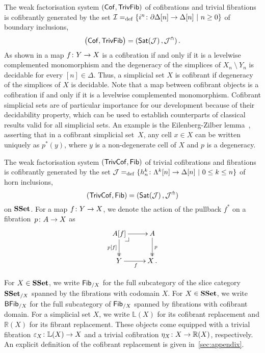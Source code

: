 \documentclass[reqno,10pt,a4paper,oneside,draft]{amsart}
\begin{document}
The weak factorisation system $(\mathsf{Cof}, \mathsf{TrivFib})$ of cofibrations and trivial fibrations  is cofibrantly generated by the set $\mathcal{I} =_{\operatorname{def}} \{ i^n \colon  \partial \Delta[n] \to \Delta[n] \ | \ n \geq 0 \}$  of boundary 
inclusions, \ie 
\[
\big( \mathsf{Cof}, \mathsf{TrivFib} \big) = ( \mathsf{Sat}(\mathcal{J}) \, , \mathcal{J}^\pitchfork) \, .
\]
As shown in \cite[Proposition~5.1.4]{henry2018wms} a map $f \colon Y \to X$ is a cofibration if  and only if 
it is a levelwise complemented monomorphism and the degeneracy of the simplices of $X_n ~\setminus~Y_n$ is decidable for every $[n] \in \Delta$. Thus, a simplicial set $X$ is
cofibrant if  degeneracy of the simplices of $X$ is decidable.
Note that a map between cofibrant objects is a cofibration
if and only if it is a levelwise complemented monomorphism. 
Cofibrant simplicial sets are of particular importance for our development because of their decidability property, which can be used to establish counterparts of classical results valid for all simplicial sets. An example is the Eilenberg-Zilber lemma~\cite[Lemma~5.1.2]{henry2018wms}, asserting that in a cofibrant simplicial set~$X$, any cell $x \in X$ can be written uniquely as $p^*(y)$, where $y$ is a non-degenerate cell of $X$ and $p$ is a degeneracy. 
\medskip

The weak factorisation system $(\mathsf{TrivCof}, \mathsf{Fib})$ of  trivial cofibrations and fibrations is cofibrantly 
generated by the set $\mathcal{J} =_{\operatorname{def}} \{ h^k_n  \colon \Lambda^k[n] \to \Delta[n]  \ | \ 0 \leq k \leq n \}$ of horn 
inclusions, \ie 
\[
(\mathsf{TrivCof}, \mathsf{Fib}) = ( \mathsf{Sat}(\mathcal{J}) \, , \mathcal{J}^\pitchfork)
\] 
on $\mathbf{SSet}$. For a map $f \colon Y \to X$, we denote the action of the pullback $f^*$ on a fibration~$p \colon A \to X$ as
\[
\xymatrix{
A[f] \ar[r] \drpullback \ar@{->>}[d]_{p[f]} & A \ar@{->>}[d]^{p} \\
Y \ar[r]_f & X \, .}
\]


For $X \in \mathbf{SSet}$, we write $\mathsf{Fib}_{/X}$ for the full subcategory of the slice category $\mathbf{SSet}_{/X}$ spanned by the fibrations with codomain $X$. For $X \in \mathbf{SSet}$, we write $\mathsf{BFib}_{/X}$ for  the full subcategory of  $\mathsf{Fib}_{/X}$ spanned by fibrations with cofibrant domain. For a simplicial set $X$, we write $\mathbb{L}(X)$ for its cofibrant replacement and $\mathbb{R}(X)$ for its
fibrant replacement. These objects come equipped with a trivial fibration $\varepsilon_X \colon \mathbb{L}(X) \to X$ and a trivial cofibration $\eta_X \colon 
X \to \mathbb{R}(X)$, respectively. An explicit definition of the cofibrant replacement is given 
in~\cref{sec:appendix}.
\end{document}
